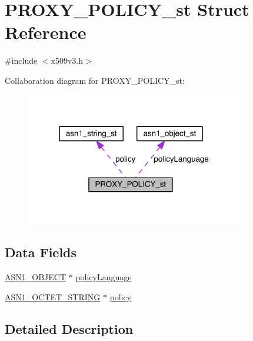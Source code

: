 \hypertarget{struct_p_r_o_x_y___p_o_l_i_c_y__st}{}\section{P\+R\+O\+X\+Y\+\_\+\+P\+O\+L\+I\+C\+Y\+\_\+st Struct Reference}
\label{struct_p_r_o_x_y___p_o_l_i_c_y__st}


{\ttfamily \#include $<$x509v3.\+h$>$}



Collaboration diagram for P\+R\+O\+X\+Y\+\_\+\+P\+O\+L\+I\+C\+Y\+\_\+st\+:\nopagebreak
\begin{figure}[H]
\begin{center}
\leavevmode
\includegraphics[width=270pt]{struct_p_r_o_x_y___p_o_l_i_c_y__st__coll__graph}
\end{center}
\end{figure}
\subsection*{Data Fields}
\begin{DoxyCompactItemize}
\item 
\hyperlink{crypto_2ossl__typ_8h_ae3fda0801e4c8e250087052bafb3ce2e}{A\+S\+N1\+\_\+\+O\+B\+J\+E\+CT} $\ast$ \hyperlink{struct_p_r_o_x_y___p_o_l_i_c_y__st_a6efaaaa93de35a9476adaba965a32327}{policy\+Language}
\item 
\hyperlink{crypto_2ossl__typ_8h_afbd05e94e0f0430a2b729473efec88c1}{A\+S\+N1\+\_\+\+O\+C\+T\+E\+T\+\_\+\+S\+T\+R\+I\+NG} $\ast$ \hyperlink{struct_p_r_o_x_y___p_o_l_i_c_y__st_a813a5b5250ba75a1ae765bbb50521474}{policy}
\end{DoxyCompactItemize}


\subsection{Detailed Description}



